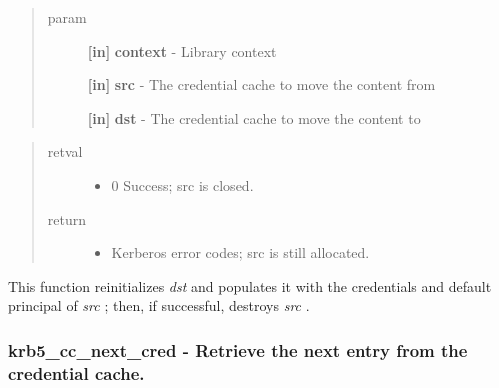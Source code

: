 \documentclass[letterpaper,10pt,english]{sphinxmanual}
\begin{document}
\begin{quote}\begin{description}
\item[{param}] \leavevmode
\textbf{{[}in{]}} \textbf{context} - Library context

\textbf{{[}in{]}} \textbf{src} - The credential cache to move the content from

\textbf{{[}in{]}} \textbf{dst} - The credential cache to move the content to

\end{description}\end{quote}
\begin{quote}\begin{description}
\item[{retval}] \leavevmode\begin{itemize}
\item {} 
0   Success; src is closed.

\end{itemize}

\item[{return}] \leavevmode\begin{itemize}
\item {} 
Kerberos error codes; src is still allocated.

\end{itemize}

\end{description}\end{quote}

This function reinitializes \emph{dst} and populates it with the credentials and default principal of \emph{src} ; then, if successful, destroys \emph{src} .


\subsubsection{krb5\_cc\_next\_cred -  Retrieve the next entry from the credential cache.}
\label{appdev/refs/api/krb5_cc_next_cred::doc}\label{appdev/refs/api/krb5_cc_next_cred:krb5-cc-next-cred-retrieve-the-next-entry-from-the-credential-cache}

\begin{fulllineitems}
\label{appdev/refs/api/krb5_cc_next_cred:c.krb5_cc_next_cred}
\end{fulllineitems}
\end{document}
